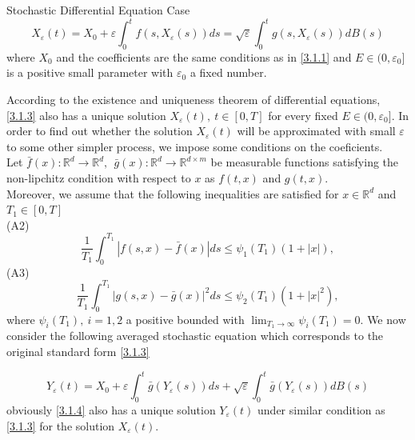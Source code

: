 \documentclass[unknownkeysallowed, compress]{beamer}
\theoremstyle{plain}
\begin{document}
\begin{frame}[allowframebreaks]{Stochastic Differential Equation Case}
\begin{equation}\label{3.1.3}
X_\varepsilon(t) = X_0+\varepsilon\int_0^tf(s,X_\varepsilon(s))ds=\sqrt{\varepsilon}\int_0^t g(s,X_\varepsilon(s))dB(s)
\end{equation}
where $X_0$ and the coefficients are the same conditions as in \eqref{3.1.1} and $E\in(0,\varepsilon_0]$ is a positive small parameter with $\varepsilon_0$ a fixed number.\\
\par According to the existence and uniqueness theorem of differential equations, \eqref{3.1.3} also has a unique solution $X_\varepsilon(t),~t\in[0,T]$ for every fixed $E\in(0,\varepsilon_0]$. In order to find out whether the solution $X_\varepsilon(t)$ will be approximated with small $\varepsilon$ to some other simpler process, we impose some conditions on the coeficients.\\
Let $\bar{f}(x):\mathbb{R}^d\rightarrow\mathbb{R}^d,~~\bar{g}(x):\mathbb{R}^d\rightarrow\mathbb{R}^{d\times m}$ be measurable functions satisfying the non-lipchitz condition with respect to $x$ as $f(t,x)$ and $g(t,x)$.\\
Moreover, we assume that the following inequalities are satisfied for $x\in\mathbb{R}^d$ and $T_1\in[0,T]$\\
(A2)
$$
\frac{1}{T_1}\int_0^{T_1}|f(s,x)-\bar{f}(x)|ds\leq \psi_1(T_1)(1+|x|),
$$
(A3)
$$
\frac{1}{T_1}\int_0^{T_1}|g(s,x) - \bar{g}(x)|^2ds\leq \psi_2(T_1)(1+|x|^2),
$$
where $\psi_i(T_1), ~i = 1,2$ a positive bounded with $\lim_{T_1\rightarrow \infty}\psi_i(T_1) = 0$. We now consider the following averaged stochastic equation which corresponds to the original standard form \eqref{3.1.3}

\begin{equation}\label{3.1.4}
Y_\varepsilon(t) = X_0+\varepsilon\int_0^{t}\bar{g}(Y_\varepsilon(s))ds+\sqrt{\varepsilon}\int_0^t\bar{g}(Y_\varepsilon(s))dB(s)
\end{equation}
obviously \eqref{3.1.4} also has a unique solution $Y_\varepsilon(t)$ under similar condition as \eqref{3.1.3} for the solution $X_\varepsilon(t)$.
\end{frame}
\end{document}

